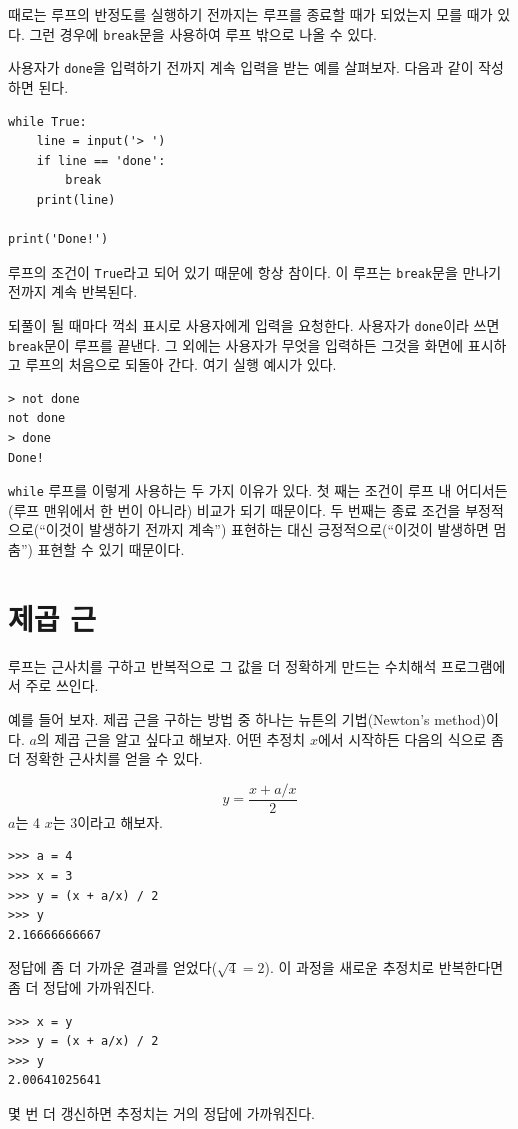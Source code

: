 \documentclass[10pt]{book}
\begin{document}
때로는 루프의 반정도를 실행하기 전까지는 루프를 종료할 때가 되었는지
모를 때가 있다.  그런 경우에 {\tt break}문을 사용하여 루프 밖으로 나올
수 있다.

사용자가 {\tt done}을 입력하기 전까지 계속 입력을 받는 예를 살펴보자.
다음과 같이 작성하면 된다.

\begin{verbatim}
while True:
    line = input('> ')
    if line == 'done':
        break
    print(line)

print('Done!')
\end{verbatim}
%
루프의 조건이 {\tt True}라고 되어 있기 때문에 항상 참이다.  이 루프는
{\tt break}문을 만나기 전까지 계속 반복된다.

되풀이 될 때마다 꺽쇠 표시로 사용자에게 입력을 요청한다.  사용자가
{\tt done}이라 쓰면 {\tt break}문이 루프를 끝낸다.  그 외에는 사용자가
무엇을 입력하든 그것을 화면에 표시하고 루프의 처음으로 되돌아 간다.
여기 실행 예시가 있다.


\begin{verbatim}
> not done
not done
> done
Done!
\end{verbatim}
%
{\tt while} 루프를 이렇게 사용하는 두 가지 이유가 있다.  첫 째는 조건이
루프 내 어디서든(루프 맨위에서 한 번이 아니라) 비교가 되기 때문이다.
두 번째는 종료 조건을 부정적으로(``이것이 발생하기 전까지 계속'')
표현하는 대신 긍정적으로(``이것이 발생하면 멈춤'') 표현할 수 있기
때문이다.


\section{제곱 근}
\label{squareroot}

루프는 근사치를 구하고 반복적으로 그 값을 더 정확하게 만드는 수치해석
프로그램에서 주로 쓰인다.

예를 들어 보자.  제곱 근을 구하는 방법 중 하나는 뉴튼의 기법(Newton's
method)이다.  $a$의 제곱 근을 알고 싶다고 해보자.  어떤 추정치 $x$에서
시작하든 다음의 식으로 좀 더 정확한 근사치를 얻을 수 있다.

\[ y = \frac{x + a/x}{2} \]
%
$a$는 4 $x$는 3이라고 해보자.

\begin{verbatim}
>>> a = 4
>>> x = 3
>>> y = (x + a/x) / 2
>>> y
2.16666666667
\end{verbatim}
%
정답에 좀 더 가까운 결과를 얻었다($\sqrt{4} = 2$).  이 과정을 새로운
추정치로 반복한다면 좀 더 정답에 가까워진다.

\begin{verbatim}
>>> x = y
>>> y = (x + a/x) / 2
>>> y
2.00641025641
\end{verbatim}
%
몇 번 더 갱신하면 추정치는 거의 정답에 가까워진다. 
\end{document}
